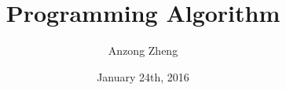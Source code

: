 \documentclass[10pt,a4paper]{book}
\begin{document}
\author{Anzong Zheng}
\title{Programming Algorithm}
\date{January 24th, 2016}
\maketitle
\newpage


\tableofcontents

\setcounter{page}{1}




\end{document}
